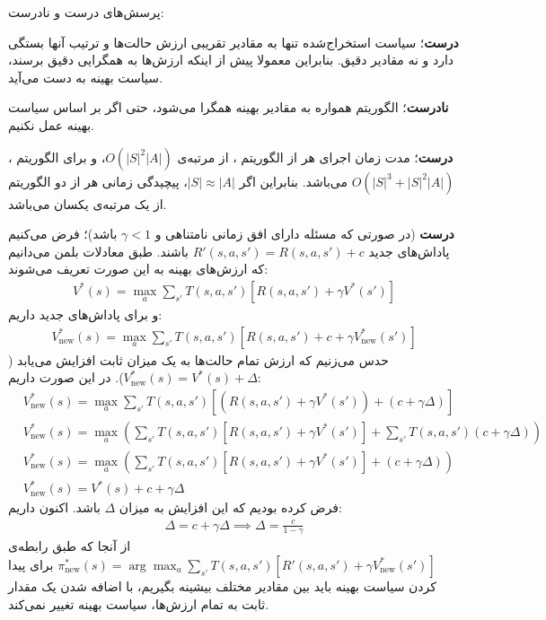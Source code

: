 \question{}

پرسش‌های درست و نادرست:

\begin{ابجد}
\item \textbf{درست}؛ سیاست استخراج‌شده تنها به مقادیر تقریبی ارزش حالت‌ها و ترتیب آنها بستگی دارد و نه مقادیر دقیق. بنابراین معمولا پیش از اینکه ارزش‌ها به همگرایی دقیق برسند، سیاست بهینه به دست می‌آید.

\item \textbf{نادرست}؛ الگوریتم  همواره به مقادیر بهینه همگرا می‌شود، حتی اگر بر اساس سیاست بهینه عمل نکنیم.

\item \textbf{درست}؛ مدت زمان اجرای هر  از الگوریتم ، از مرتبه‌ی $O(|S|^2|A|)$، و برای الگوریتم ، $O(|S|^3 + |S|^2|A|)$ می‌باشد. بنابراین اگر $|S| \approx |A|$، پیچیدگی زمانی هر  از دو الگوریتم از یک مرتبه‌ی یکسان می‌باشد.

\item \textbf{درست} (در صورتی که مسئله دارای افق زمانی نامتناهی و $\gamma < 1$ باشد)؛ فرض می‌کنیم پاداش‌های جدید $R'(s,a,s') = R(s,a,s') + c$ باشند. طبق معادلات بلمن می‌دانیم که ارزش‌های بهینه به این صورت تعریف می‌شوند:
\begin{align*}
    V^*(s) = \max_a \sum_{s'} T(s, a, s') \left[ R(s, a, s') + \gamma V^*(s') \right]
\end{align*}
و برای پاداش‌های جدید داریم:
\begin{align*}
    V_{\text{new}}^*(s) = \max_a \sum_{s'} T(s, a, s') \left[ R(s, a, s') + c + \gamma V_{\text{new}}^*(s') \right]
\end{align*}
حدس می‌زنیم که ارزش تمام حالت‌ها به یک میزان ثابت افزایش می‌یابد ($V_{\text{new}}^*(s) = V^*(s) + \Delta$). در این صورت داریم:
\begin{align*}
     & V_{\text{new}}^*(s) = \max_a \sum_{s'} T(s, a, s') \left[ \left( R(s, a, s') + \gamma V^*(s') \right) + (c + \gamma \Delta) \right]          \\
     & V_{\text{new}}^*(s) = \max_a \left( \sum_{s'} T(s, a, s') [R(s, a, s') + \gamma V^*(s')] + \sum_{s'} T(s, a, s') (c + \gamma \Delta) \right) \\
     & V_{\text{new}}^*(s) = \max_a \left( \sum_{s'} T(s, a, s') [R(s, a, s') + \gamma V^*(s')] + (c + \gamma \Delta) \right)                       \\
     & V_{\text{new}}^*(s) = V^*(s) + c + \gamma \Delta
\end{align*}
فرض کرده بودیم که این افزایش به میزان $\Delta$ باشد. اکنون داریم:
\begin{align*}
    \Delta = c + \gamma \Delta \implies \Delta = \frac{c}{1 - \gamma}
\end{align*}
از آنجا که طبق رابطه‌ی $\pi^*_{\text{new}}(s) = \arg\max_a \sum_{s'} T(s, a, s') \left[ R'(s, a, s') + \gamma V_{\text{new}}^*(s') \right]$ برای پیدا کردن سیاست بهینه باید بین مقادیر مختلف بیشینه بگیریم، با اضافه شدن یک مقدار ثابت به تمام ارزش‌ها، سیاست بهینه تغییر نمی‌کند.


\end{ابجد}

